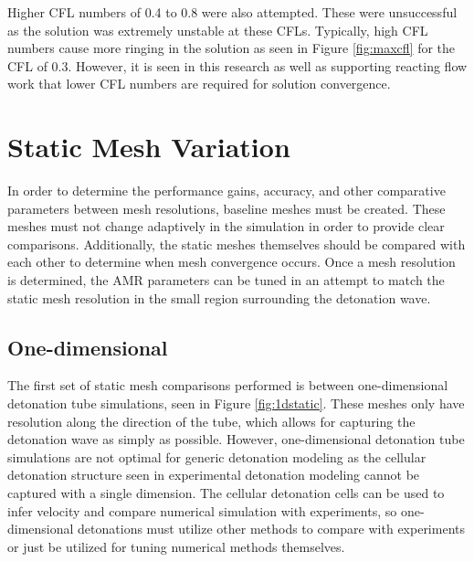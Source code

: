 Higher CFL numbers of 0.4 to 0.8 were also attempted. These were unsuccessful as the solution was extremely unstable at these CFLs. Typically, high CFL numbers cause more ringing in the solution as seen in Figure \ref{fig:maxcfl} for the CFL of 0.3. However, it is seen in this research as well as supporting reacting flow work \cite{ajaero} that lower CFL numbers are required for solution convergence. 

\section{Static Mesh Variation}
\label{sec:staticvar}
In order to determine the performance gains, accuracy, and other comparative parameters between mesh resolutions, baseline meshes must be created. These meshes must not change adaptively in the simulation in order to provide clear comparisons. Additionally, the static meshes themselves should be compared with each other to determine when mesh convergence occurs. Once a mesh resolution is determined, the AMR parameters can be tuned in an attempt to match the static mesh resolution in the small region surrounding the detonation wave. 


\subsection{One-dimensional}
The first set of static mesh comparisons performed is between one-dimensional detonation tube simulations, seen in Figure \ref{fig:1dstatic}. These meshes only have resolution along the direction of the tube, which allows for capturing the detonation wave as simply as possible. However,  one-dimensional detonation tube simulations are not optimal for generic detonation modeling as the cellular detonation structure seen in experimental detonation modeling cannot be captured with a single dimension. The cellular detonation cells can be used to infer velocity and compare numerical simulation with experiments, so one-dimensional detonations must utilize other methods to compare with experiments or just be utilized for tuning numerical methods themselves. 

